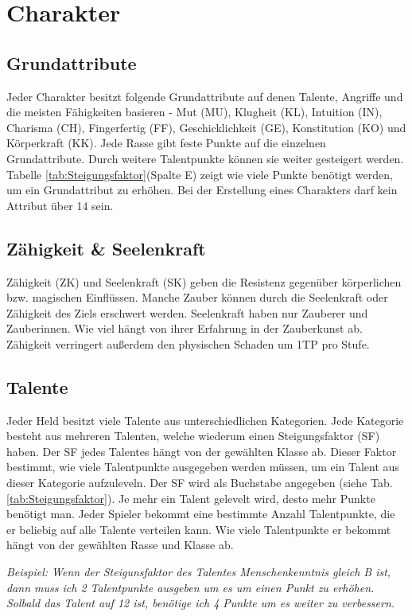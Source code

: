 {\let\clearpage\relax\chapter{Charakter}}
\section{Grundattribute}
Jeder Charakter besitzt folgende Grundattribute auf denen Talente, Angriffe und die meisten Fähigkeiten basieren - Mut (MU), Klugheit (KL), Intuition (IN), Charisma (CH), Fingerfertig (FF), Geschicklichkeit (GE), Konstitution (KO) und Körperkraft (KK). Jede Rasse gibt feste Punkte auf die einzelnen Grundattribute. Durch weitere Talentpunkte können sie weiter gesteigert werden. Tabelle \ref{tab:Steigungsfaktor}(Spalte E) zeigt wie viele Punkte benötigt werden, um ein Grundattribut zu erhöhen. Bei der Erstellung eines Charakters darf kein Attribut über 14 sein.

\section{Zähigkeit \& Seelenkraft}
Zähigkeit (ZK) und Seelenkraft (SK) geben die Resistenz gegenüber körperlichen bzw. magischen Einflüssen. Manche Zauber können durch die Seelenkraft oder Zähigkeit des Ziels erschwert werden. Seelenkraft haben nur Zauberer und Zauberinnen. Wie viel hängt von ihrer Erfahrung in der Zauberkunst ab. Zähigkeit verringert außerdem den physischen Schaden um 1TP pro Stufe.

\section{Talente}
Jeder Held besitzt viele Talente aus unterschiedlichen Kategorien. Jede Kategorie besteht aus mehreren Talenten, welche wiederum einen Steigungsfaktor (SF) haben. Der SF jedes Talentes hängt von der gewählten Klasse ab. Dieser Faktor bestimmt, wie viele Talentpunkte ausgegeben werden müssen, um ein Talent aus dieser Kategorie aufzuleveln. Der SF wird als Buchstabe angegeben (siehe Tab. \ref{tab:Steigungsfaktor}). Je mehr ein Talent gelevelt wird, desto mehr Punkte benötigt man. Jeder Spieler bekommt eine bestimmte Anzahl Talentpunkte, die er beliebig auf alle Talente verteilen kann. Wie viele Talentpunkte er bekommt hängt von der gewählten Rasse und Klasse ab.
 
\textit{Beispiel: Wenn der Steigunsfaktor des Talentes Menschenkenntnis gleich B ist, dann muss ich 2 Talentpunkte ausgeben um es um einen Punkt zu erhöhen. Solbald das Talent auf 12 ist, benötige ich 4 Punkte um es weiter zu verbessern.}

